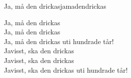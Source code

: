 \begin{song}{Ja, må den drickas}{jamadendrickas}
\begin{vers}
Ja, må den drickas\\
Ja, må den drickas\\
Ja, må den drickas uti hundrade tår!\\
Javisst, ska den drickas\\
Javisst, ska den drickas\\
Javisst, ska den drickas uti hundrade tår!\\
\end{vers}
\end{song}
